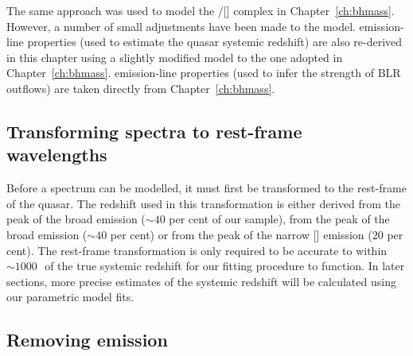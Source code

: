 The same approach was used to model the \hbns/[] complex in Chapter~\ref{ch:bhmass}. 
However, a number of small adjustments have been made to the model. 
\ha emission-line properties (used to estimate the quasar systemic redshift) are also re-derived in this chapter using a slightly modified model to the one adopted in Chapter~\ref{ch:bhmass}. 
 emission-line properties (used to infer the strength of BLR outflows) are taken directly from Chapter~\ref{ch:bhmass}. 

\subsection{Transforming spectra to rest-frame wavelengths}

Before a spectrum can be modelled, it must first be transformed to the rest-frame of the quasar.  
The redshift used in this transformation is either derived from the peak of the broad \ha emission ($\sim40$ per cent of our sample), from the peak of the broad \hb emission ($\sim40$ per cent) or from the peak of the narrow [] emission ($20$ per cent).
The rest-frame transformation is only required to be accurate to within $\sim1000$\,\kms\, of the true systemic redshift for our fitting procedure to function. 
In later sections, more precise estimates of the systemic redshift will be calculated using our parametric model fits. 

\subsection{Removing  emission}
\label{sec:ch4-fe-removal}

